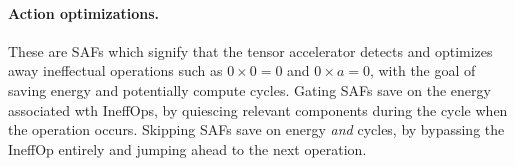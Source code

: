 %
%
%
%
%
%
\paragraph{Action optimizations.} These are SAFs which signify that the tensor accelerator detects and optimizes away ineffectual operations such as $0 \times 0 = 0$ and $0 \times a = 0$, with the goal of saving energy and potentially compute cycles. Gating SAFs save on the energy associated wth IneffOps\cite{sparseloop}, by quiescing relevant components during the cycle when the operation occurs. Skipping SAFs save on energy \textit{and} cycles, by bypassing the IneffOp entirely and jumping ahead to the next operation.

